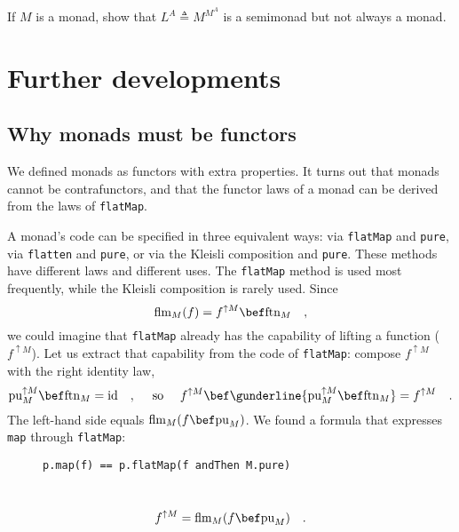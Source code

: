 If $M$ is a monad, show that $L^{A}\triangleq M^{M^{A}}$ is a semimonad
but not always a monad.

\section{Further developments}

\subsection{Why monads must be functors}

We defined monads as functors with extra properties. It turns out
that monads cannot be contrafunctors, and that the functor laws of
a monad can be derived from the laws of \lstinline!flatMap!.

A monad\textsf{'}s code can be specified in three equivalent ways: via \lstinline!flatMap!
and \lstinline!pure!, via \lstinline!flatten! and \lstinline!pure!,
or via the Kleisli composition and \lstinline!pure!. These methods
have different laws and different uses. The \lstinline!flatMap! method
is used most frequently, while the Kleisli composition is rarely used.
Since
\[
\text{flm}_{M}(f)=f^{\uparrow M}\bef\text{ftn}_{M}\quad,
\]
we could imagine that \lstinline!flatMap! already has the capability
of lifting a function ($f^{\uparrow M}$). Let us extract that capability
from the code of \lstinline!flatMap!: compose $f^{\uparrow M}$ with
the right identity law,
\[
\text{pu}_{M}^{\uparrow M}\bef\text{ftn}_{M}=\text{id}\quad,\quad\text{ so }\quad f^{\uparrow M}\bef\gunderline{\text{pu}_{M}^{\uparrow M}\bef\text{ftn}_{M}}=f^{\uparrow M}\quad.
\]
The left-hand side equals $\text{flm}_{M}(f\bef\text{pu}_{M})$. We
found a formula that expresses \lstinline!map! through \lstinline!flatMap!:

\begin{wrapfigure}{l}{0.5\columnwidth}%
\vspace{-0.5\baselineskip}
\begin{lstlisting}
p.map(f) == p.flatMap(f andThen M.pure)
\end{lstlisting}

\vspace{-0.5\baselineskip}
\end{wrapfigure}%

~\vspace{-0.1\baselineskip}
\[
f^{\uparrow M}=\text{flm}_{M}(f\bef\text{pu}_{M})\quad.
\]

